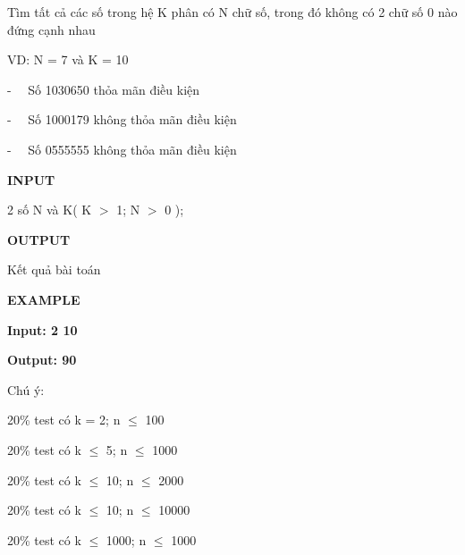 



    Tìm tất cả các số trong hệ K phân có N chữ số, trong đó không có 2 chữ số 0 nào đứng cạnh nhau   



    VD: N = 7 và K = 10   

    -   Số 1030650 thỏa mãn điều kiện   

    -   Số 1000179 không thỏa mãn điều kiện   

    -   Số 0555555 không thỏa mãn điều kiện   



\textbf{     INPUT    }

    2 số N và K( K $>$ 1; N $>$ 0 );    




\textbf{     OUTPUT    }

    Kết quả bài toán   



\textbf{     EXAMPLE    }

\textbf{      Input: 2 10     }

\textbf{      Output: 90     }



     Chú ý:    

     20\% test có k = 2; n  $\le$  100    

     20\% test có k  $\le$  5; n  $\le$  1000    

     20\% test có k  $\le$  10; n  $\le$  2000    

     20\% test có k  $\le$  10; n  $\le$  10000    

     20\% test có k  $\le$  1000; n  $\le$  1000     



